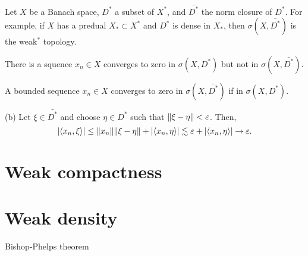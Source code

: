 \documentclass{../../large}
\begin{document}
\begin{prb}
Let $X$ be a Banach space, $D^*$ a subset of $X^*$, and $\bar{D^*}$ the norm closure of $D^*$.
For example, if $X$ has a predual $X_*\subset X^*$ and $D^*$ is dense in $X_*$, then $\sigma(X,\bar{D^*})$ is the weak$^*$ topology.
\begin{parts}
\item There is a squence $x_n\in X$ converges to zero in $\sigma(X,D^*)$ but not in $\sigma(X,\bar{D^*})$.
\item A bounded sequence $x_n\in X$ converges to zero in $\sigma(X,\bar{D^*})$ if in $\sigma(X,D^*)$.
\end{parts}
\end{prb}
\begin{pf}
(b)
Let $\xi\in\bar{D^*}$ and choose $\eta\in D^*$ such that $\|\xi-\eta\|<\varepsilon$.
Then,
\[|\langle x_n,\xi\rangle|\le\|x_n\|\|\xi-\eta\|+|\langle x_n,\eta\rangle|\lesssim\varepsilon+|\langle x_n,\eta\rangle|\to\varepsilon.\]
\end{pf}



\section{Weak compactness}
\begin{prb}
\end{prb}
\begin{prb}
\end{prb}
\begin{prb}
\end{prb}

\section{Weak density}
Bishop-Phelps theorem
\end{document}
